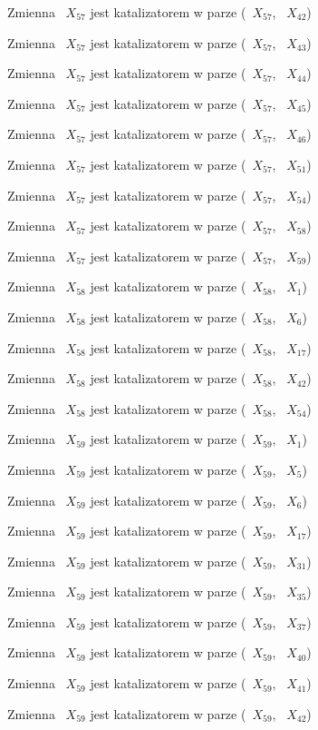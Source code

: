 \documentclass{article}
\begin{document}
Zmienna ~$X_{57}$ jest katalizatorem w parze (~$X_{57}$, ~$X_{42}$)

Zmienna ~$X_{57}$ jest katalizatorem w parze (~$X_{57}$, ~$X_{43}$)

Zmienna ~$X_{57}$ jest katalizatorem w parze (~$X_{57}$, ~$X_{44}$)

Zmienna ~$X_{57}$ jest katalizatorem w parze (~$X_{57}$, ~$X_{45}$)

Zmienna ~$X_{57}$ jest katalizatorem w parze (~$X_{57}$, ~$X_{46}$)

Zmienna ~$X_{57}$ jest katalizatorem w parze (~$X_{57}$, ~$X_{51}$)

Zmienna ~$X_{57}$ jest katalizatorem w parze (~$X_{57}$, ~$X_{54}$)

Zmienna ~$X_{57}$ jest katalizatorem w parze (~$X_{57}$, ~$X_{58}$)

Zmienna ~$X_{57}$ jest katalizatorem w parze (~$X_{57}$, ~$X_{59}$)

Zmienna ~$X_{58}$ jest katalizatorem w parze (~$X_{58}$, ~$X_{1}$)

Zmienna ~$X_{58}$ jest katalizatorem w parze (~$X_{58}$, ~$X_{6}$)

Zmienna ~$X_{58}$ jest katalizatorem w parze (~$X_{58}$, ~$X_{17}$)

Zmienna ~$X_{58}$ jest katalizatorem w parze (~$X_{58}$, ~$X_{42}$)

Zmienna ~$X_{58}$ jest katalizatorem w parze (~$X_{58}$, ~$X_{54}$)

Zmienna ~$X_{59}$ jest katalizatorem w parze (~$X_{59}$, ~$X_{1}$)

Zmienna ~$X_{59}$ jest katalizatorem w parze (~$X_{59}$, ~$X_{5}$)

Zmienna ~$X_{59}$ jest katalizatorem w parze (~$X_{59}$, ~$X_{6}$)

Zmienna ~$X_{59}$ jest katalizatorem w parze (~$X_{59}$, ~$X_{17}$)

Zmienna ~$X_{59}$ jest katalizatorem w parze (~$X_{59}$, ~$X_{31}$)

Zmienna ~$X_{59}$ jest katalizatorem w parze (~$X_{59}$, ~$X_{35}$)

Zmienna ~$X_{59}$ jest katalizatorem w parze (~$X_{59}$, ~$X_{37}$)

Zmienna ~$X_{59}$ jest katalizatorem w parze (~$X_{59}$, ~$X_{40}$)

Zmienna ~$X_{59}$ jest katalizatorem w parze (~$X_{59}$, ~$X_{41}$)

Zmienna ~$X_{59}$ jest katalizatorem w parze (~$X_{59}$, ~$X_{42}$)
\end{document}
